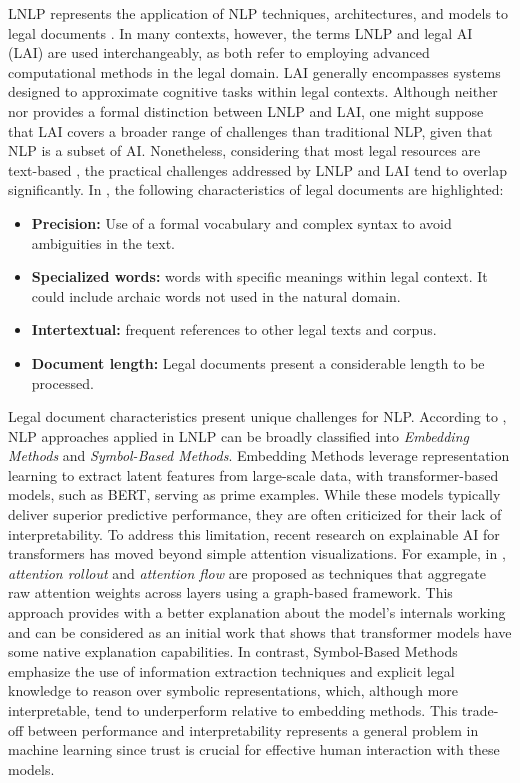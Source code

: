 \documentclass[onecolumn, journal, english, 12pt, a4paper]{IEEEtran} %
\theoremstyle{definition}
\begin{document}
LNLP represents the application of NLP techniques, architectures, and
models to legal documents \cite{Ariai2024}\cite{Zhong2020}. In many
contexts, however, the terms LNLP and legal AI (LAI) are used
interchangeably, as both refer to employing advanced computational
methods in the legal domain. LAI generally encompasses systems
designed to approximate cognitive tasks within legal
contexts. Although neither \cite{Zhong2020} nor \cite{Ariai2024}
provides a formal distinction between LNLP and LAI, one might suppose
that LAI covers a broader range of challenges than traditional NLP,
given that NLP is a subset of AI. Nonetheless, considering that most
legal resources are text-based \cite{Zhong2020}, the practical
challenges addressed by LNLP and LAI tend to overlap significantly. In
\cite{Ariai2024}, the following characteristics of legal documents are
highlighted:


\begin{itemize}
\item \textbf{Precision:} Use of a formal vocabulary and complex
  syntax to avoid ambiguities in the text.
\item \textbf{Specialized words:} words with specific meanings within legal
  context. It could include archaic words not used in the natural domain.
\item \textbf{Intertextual:} frequent references to other legal texts
  and corpus.
\item \textbf{Document length:} Legal documents present a considerable
  length to be processed.
\end{itemize}


Legal document characteristics present unique challenges for
NLP. According to \cite{Zhong2020}, NLP approaches applied in LNLP can
be broadly classified into \textit{Embedding Methods} and
\textit{Symbol-Based Methods}. Embedding Methods leverage
representation learning to extract latent features from large-scale
data, with transformer-based models, such as BERT, serving as prime
examples. While these models typically deliver superior predictive
performance, they are often criticized for their lack of
interpretability. To address this limitation, recent research on
explainable AI for transformers has moved beyond simple attention
visualizations. For example, in \cite{Abnar2020}, \textit{attention
  rollout} and \textit{attention flow} are proposed as techniques that
aggregate raw attention weights across layers using a graph-based
framework. This approach provides with a better explanation about the
model's internals working and can be considered as an initial work
that shows that transformer models have some native explanation
capabilities. In contrast, Symbol-Based Methods emphasize the use of
information extraction techniques and explicit legal knowledge to
reason over symbolic representations, which, although more
interpretable, tend to underperform relative to embedding
methods. This trade-off between performance and interpretability
represents a  general problem in machine learning since trust is
crucial for effective human interaction with these
models\cite{ribeiro2016}.
\end{document}
